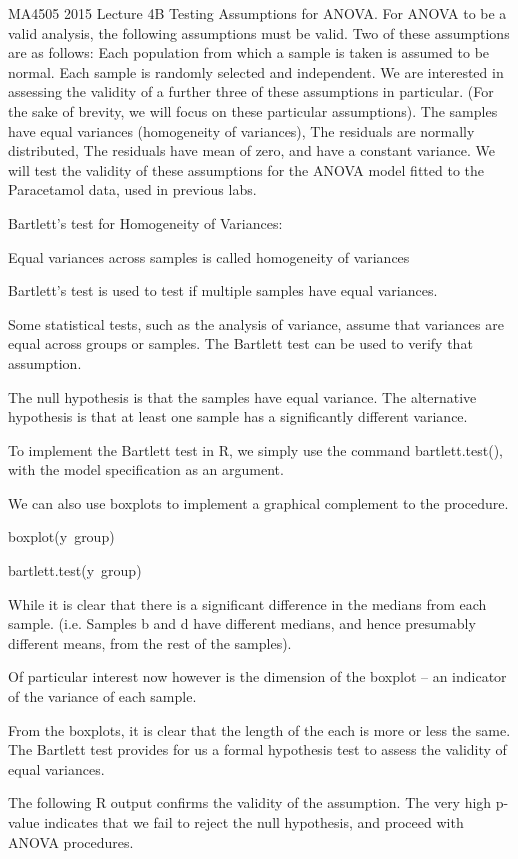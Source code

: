 MA4505 2015 Lecture 4B 
Testing Assumptions for ANOVA.
For ANOVA to be a valid analysis, the following assumptions must be valid. Two of these assumptions are as follows:
Each population from which a sample is taken is assumed to be normal.
Each sample is randomly selected and independent.
We are interested in assessing the validity of a further three of these assumptions in particular. (For the sake of brevity, we will focus on these particular assumptions).
The samples have equal variances (homogeneity of variances),
The residuals are normally distributed,
The residuals have mean of zero, and have a constant variance.
We will test the validity of these assumptions for the ANOVA model fitted to the Paracetamol data, used in previous labs.


Bartlett's test for Homogeneity of Variances: 

Equal variances across samples is called homogeneity of variances

Bartlett's test is used to test if multiple samples have equal variances. 

Some statistical tests, such as the analysis of variance, assume that variances are equal across groups or samples.  The Bartlett test can be used to verify that assumption.

The null hypothesis is that the samples have equal variance. 
The alternative hypothesis is that at least one sample has a significantly different variance.


To implement the Bartlett test in R, we simply use the command bartlett.test(), with the model specification as an argument. 

We can also use boxplots to implement a graphical complement to the procedure.

boxplot(y~group)

bartlett.test(y~group)


While it is clear that there is a significant difference in the medians from each sample. (i.e. Samples b and d have different medians, and hence presumably different means, from the rest of the samples).

Of particular interest now however is the dimension of the boxplot – an indicator of the variance of each sample.

From the boxplots, it is clear that the length of the each is more or less the same. The Bartlett test provides for us a formal hypothesis test to assess the validity of equal variances.

The following R output confirms the validity of the assumption. The very high p-value indicates that we fail to reject the null hypothesis, and proceed with ANOVA procedures.

